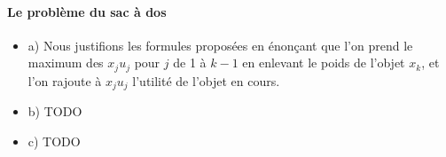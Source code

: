 \paragraph{Le problème du sac à dos}
\begin{itemize}
\item a) Nous justifions les formules proposées en énonçant que l'on
  prend le maximum des $x_ju_j$ pour $j$ de 1 à $k-1$ en enlevant le
  poids de l'objet $x_k$, et l'on rajoute à $x_ju_j$ l'utilité de
  l'objet en cours.
\item b) TODO
\item c) TODO
\end{itemize}

